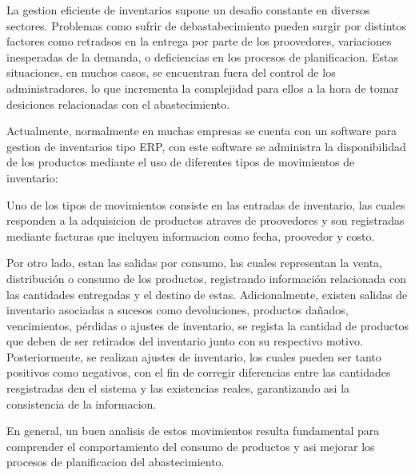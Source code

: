 La gestion eficiente de inventarios supone un desafio constante en diversos sectores. Problemas como sufrir de debastabecimiento pueden surgir por distintos factores como retradsos en la entrega por parte de los proovedores, variaciones inesperadas de la demanda, o deficiencias en los procesos de planificacion. Estas situaciones, en muchos casos, se encuentran fuera del control de los administradores, lo que incrementa la complejidad para ellos a la hora de tomar desiciones relacionadas con el abastecimiento.

Actualmente, normalmente en muchas empresas se cuenta con un software para gestion de inventarios tipo ERP, con este software se administra la disponibilidad de los productos mediante el uso de diferentes tipos de movimientos de inventario:

Uno de los tipos de movimientos consiste en las entradas de inventario, las cuales responden a la adquisicion de productos atraves de proovedores y son registradas mediante facturas que incluyen informacion como fecha, proovedor y costo. 

Por otro lado, estan las salidas por consumo, las cuales representan la venta, distribución o consumo de los productos, registrando información relacionada con las cantidades entregadas y el destino de estas. Adicionalmente, existen salidas de inventario asociadas a sucesos como devoluciones, productos dañados, vencimientos, pérdidas o ajustes de inventario, se regista la cantidad de productos que deben de ser retirados del inventario junto con su respectivo motivo. Posteriormente, se realizan ajustes de inventario, los cuales pueden ser tanto positivos como negativos, con el fin de corregir diferencias entre las cantidades resgistradas den el sistema y las existencias reales, garantizando asi la consistencia de la informacion.

En general, un buen analisis de estos movimientos resulta fundamental para comprender el comportamiento del consumo de productos y asi mejorar los procesos de planificacion del abastecimiento.